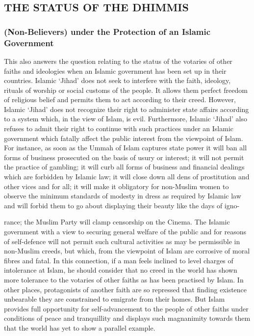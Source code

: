 \hypertarget{the-status-of-the-dhimmis}{%
\subsection{THE STATUS OF THE DHIMMIS}\label{the-status-of-the-dhimmis}}

\hypertarget{non-believers-under-the-protection-of-an-islamic-government}{%
\subsubsection{(Non-Believers) under the Protection of an Islamic
Government}\label{non-believers-under-the-protection-of-an-islamic-government}}

This also answers the question relating to the status of the votaries of
other faiths and ideologies when an Islamic government has been set up
in their countries. Islamic `Jihad' does not seek to interfere with the
faith, ideology, rituals of worship or social customs of the people. It
allows them perfect freedom of religious belief and permits them to act
according to their creed. However, Islamic `Jihad' does not recognize
their right to administer state affairs according to a system which, in
the view of Islam, is evil. Furthermore, Islamic `Jihad' also refuses to
admit their right to continue with such practices under an Islamic
government which fatally affect the public interest from the viewpoint
of Islam. For instance, as soon as the Ummah of Islam captures state
power it will ban all forms of business prosecuted on the basis of usury
or interest; it will not permit the practice of gambling; it will curb
all forms of business and financial dealings which are forbidden by
Islamic law; it will close down all dens of prostitution and other vices
and for all; it will make it obligatory for non-Muslim women to observe
the minimum standards of modesty in dress as required by Islamic law and
will forbid them to go about displaying their beauty like the days of
igno-

rance; the Muslim Party will clamp censorship on the Cinema. The Islamic
government with a view to securing general welfare of the public and for
reasons of self-defence will not permit such cultural activities as may
be permissible in non-Muslim creeds, but which, from the viewpoint of
Islam are corrosive of moral fibres and fatal. In this connection, if a
man feels inclined to level charges of intolerance at Islam, he should
consider that no creed in the world has shown more tolerance to the
votaries of other faiths as has been practised by Islam. In other
places, protagonists of another faith are so repressed that finding
existence unbearable they are constrained to emigrate from their homes.
But Islam provides full opportunity for self-advancement to the people
of other faiths under conditions of peace and tranquillity and displays
such magnanimity towards them that the world has yet to show a parallel
example.

